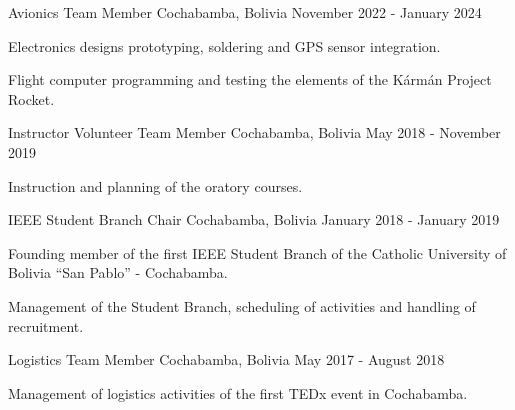 

\begin{cventries}
  {Avionics Team Member}
  {Cochabamba, Bolivia}
  {November 2022 - January 2024}
  {%
    \begin{cvitems}
      \item Electronics designs prototyping, soldering and  GPS sensor
      integration.
      \item Flight computer programming and testing the elements of
      the Kármán Project Rocket.
    \end{cvitems}
  }%

  {Instructor Volunteer Team Member}
  {Cochabamba, Bolivia}
  {May 2018 - November 2019}
  {%
    \begin{cvitems}
      \item Instruction and planning of the oratory courses.
    \end{cvitems}
  }

  {IEEE Student Branch Chair}
  {Cochabamba, Bolivia} 
  {January 2018 - January 2019} 
  {%
    \begin{cvitems}
      \item Founding member of the first IEEE Student Branch of the
      Catholic University of Bolivia ``San Pablo'' - Cochabamba.
      \item Management of the Student Branch, scheduling of activities
      and handling of recruitment.
    \end{cvitems}
  }

  {Logistics Team Member}
  {Cochabamba, Bolivia}
  {May 2017 - August 2018}
  {%
    \begin{cvitems}
      \item Management of logistics activities of the first TEDx event
      in Cochabamba.
    \end{cvitems}
  }

\end{cventries}
